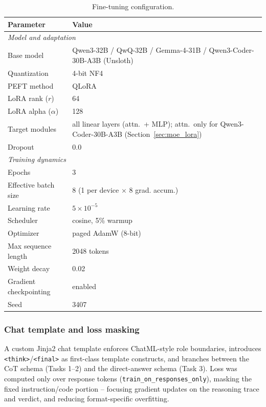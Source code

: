 \documentclass[lettersize,journal]{IEEEtran}
\begin{document}
\begin{table}[t]
\centering
\caption{Fine-tuning configuration.}
\label{tab:hyperparams}
\begin{tabular}{@{}lp{}@{}}
\toprule
\textbf{Parameter} & \textbf{Value} \\
\midrule
\multicolumn{2}{l}{\emph{Model and adaptation}} \\
\midrule
Base model & Qwen3-32B / QwQ-32B / Gemma-4-31B / Qwen3-Coder-30B-A3B (Unsloth) \\
Quantization & 4-bit NF4 \\
PEFT method & QLoRA \\
LoRA rank ($r$) & 64 \\
LoRA alpha ($\alpha$) & 128 \\
Target modules & all linear layers (attn.\ + MLP); attn.\ only for Qwen3-Coder-30B-A3B
(Section~\ref{sec:moe_lora}) \\
Dropout & 0.0 \\
\midrule
\multicolumn{2}{l}{\emph{Training dynamics}} \\
\midrule
Epochs & 3 \\
Effective batch size & 8 (1 per device $\times$ 8 grad. accum.) \\
Learning rate & $5\times 10^{-5}$ \\
Scheduler & cosine, 5\% warmup \\
Optimizer & paged AdamW (8-bit) \\
Max sequence length & 2048 tokens \\
Weight decay & 0.02 \\
Gradient checkpointing & enabled \\
Seed & 3407 \\
\bottomrule
\end{tabular}
\end{table}

\subsubsection{Chat template and loss masking}
A custom Jinja2 chat template enforces ChatML-style role boundaries, introduces
\texttt{<think>}/\texttt{<final>} as first-class template constructs, and branches between the CoT
schema (Tasks 1--2) and the direct-answer schema (Task 3). Loss was computed only over response
tokens (\texttt{train\_on\_responses\_only}), masking the fixed instruction/code portion -- focusing
gradient updates on the reasoning trace and verdict, and reducing format-specific overfitting.
\end{document}
